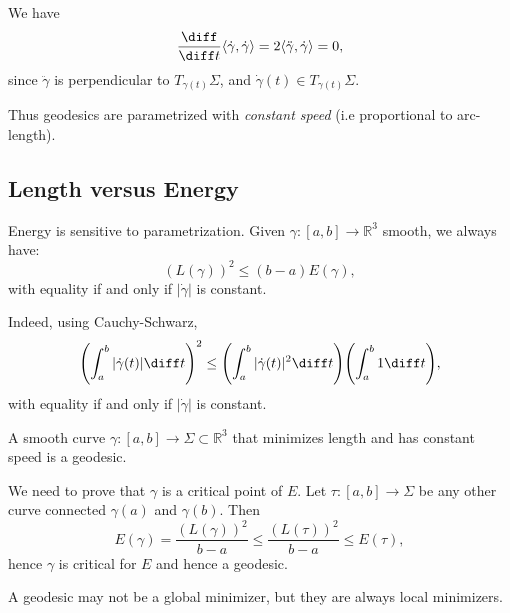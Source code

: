 \documentclass[12pt]{article}
\begin{document}
\begin{proofbox}
	We have
	\[
	\frac{\diff}{\diff t} \langle \dot \gamma, \dot \gamma \rangle = 2 \langle \ddot \gamma, \dot \gamma \rangle = 0,
	\]
	since $\ddot \gamma$ is perpendicular to $T_{\gamma(t)}\Sigma$, and $\dot \gamma(t) \in T_{\gamma(t)}\Sigma$.
\end{proofbox}

Thus geodesics are parametrized with \emph{constant speed} (i.e proportional to arc-length).

\subsection{Length versus Energy}
\label{sub:length_versus_energy}

Energy is sensitive to parametrization. Given $\gamma : [a, b] \to \mathbb{R}^3$ smooth, we always have:
\[
	(L(\gamma))^2 \leq (b - a) E(\gamma),
\]
with equality if and only if $|\dot \gamma|$ is constant.

Indeed, using Cauchy-Schwarz,
\[
\Biggl( \int_{a}^{b} | \dot \gamma(t)|\diff t \Biggr)^2 \leq \Biggl( \int_{a}^{b} |\dot \gamma(t)|^2 \diff t \Biggr) \Biggl( \int_{a}^{b} 1 \diff t \Biggr),
\]
with equality if and only if $|\dot \gamma|$ is constant.

\begin{corollary}
	A smooth curve $\gamma : [a, b] \to \Sigma \subset \mathbb{R}^3$ that minimizes length and has constant speed is a geodesic.
\end{corollary}

\begin{proofbox}
	We need to prove that $\gamma$ is a critical point of $E$. Let $\tau : [a, b] \to \Sigma$ be any other curve connected $\gamma(a)$ and $\gamma(b)$. Then
	\[
	E(\gamma) = \frac{(L(\gamma))^2}{b - a} \leq \frac{(L(\tau))^2}{b - a} \leq E(\tau),
	\]
	hence $\gamma$ is critical for $E$ and hence a geodesic.
\end{proofbox}

A geodesic may not be a global minimizer, but they are always local minimizers.
\end{document}
